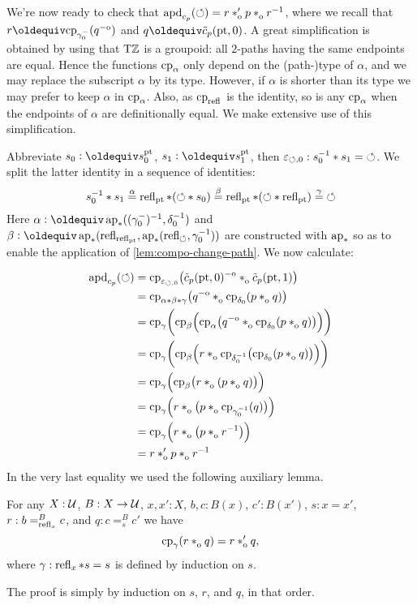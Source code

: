 \documentclass[a4paper,12pt]{amsart}
\begin{document}
We're now ready to check that $\apd{c_p}(\Zloop) = r \ctop p \cto r^{-1}$,
where we recall that $r\jdeq\cp{\gamma_0^-}(q\invo)$ and $q\jdeq\tilde c_p(\pt,0)$.
A great simplification is obtained by using that ${\mathrm{T}\mathbb{Z}}$ is a groupoid:
all $2$-paths having the same endpoints are equal.
Hence the functions $\mathrm{cp}_{\alpha}$ only depend on the (path-)type
of $\alpha$, and we may replace the subscript $\alpha$ by its type.
However, if $\alpha$ is shorter than its type we may
prefer to keep $\alpha$ in $\mathrm{cp}_{\alpha}$.
Also, as $\mathrm{cp}_{\mathop{{\mathrm{refl}}_{}}}$ is the identity, so is any $\mathrm{cp}_{\alpha}$
when the endpoints of $\alpha$ are definitionally equal.
We make extensive use of this simplification.

Abbreviate $s_0 \defeq s^\pt_0$, $s_1 \defeq s^\pt_1$,
then $\varepsilon_{{\circlearrowleft},0} : s_0^{-1} * s_1 = {{\circlearrowleft}}$.
We split the latter identity in a sequence of identities:
\[
s_0^{-1} * s_1 \stackrel{\alpha}{=}
\mathop{{\mathrm{refl}}_{{\mathord{\mathrm{pt}}}}}*({\circlearrowleft}* s_0) \stackrel{\beta}{=}
\mathop{{\mathrm{refl}}_{{\mathord{\mathrm{pt}}}}}*({\circlearrowleft}*\mathop{{\mathrm{refl}}_{{\mathord{\mathrm{pt}}}}})\stackrel{\gamma}{=} {{\circlearrowleft}}
\]
Here $\alpha\defeq\apc((\gamma_0^-)^{-1},\delta_0^{-1})$ and
$\beta\defeq\apc(\refl{\refl{\pt}},\apc(\refl{\Zloop},\gamma_0^{-1}))$ are constructed with $\mathop{\mathrm{ap}_{*}}$ so as to
enable the application of \cref{lem:compo-change-path}.
We now calculate:

\begin{align*}
  \apd{c_p}(\Zloop)
  &= \cp{\varepsilon_{\Zloop,0}}
    \bigl(\tilde c_p(\pt,0)\invo \cto \tilde c_p(\pt,1)\bigr) \\
  &= \cp{\alpha\ct\beta\ct\gamma}
    \bigl(q\invo \cto \cp{\delta_0}(p \cto q)\bigr) \\
  &= \cp{\gamma}\biggl(\cp{\beta}\Bigl(\cp{\alpha}
    \bigl(q\invo \cto \cp{\delta_0}(p \cto q)\bigr)\Bigr)\biggr) \\
  &= \cp{\gamma}\biggl(\cp{\beta}\Bigl(
    r \cto \cp{\delta_0^{-1}}\bigl(\cp{\delta_0}(p \cto q)\bigr)
    \Bigr)\biggr) \\
  &= \cp{\gamma}\Bigl(\cp{\beta}\bigl(
    r \cto (p \cto q)\bigr)\Bigr) \\
  &= \cp{\gamma}\Bigl(r \cto \bigl(p \cto \cp{\gamma_0^{-1}}(q)\bigl)\Bigr) \\
  &= \cp{\gamma}\Bigl(r \cto \bigl(p \cto r^{-1}\bigl)\Bigr) \\
  &= r \ctop p \cto r^{-1}
\end{align*}
In the very last equality we used the following auxiliary lemma.
\begin{lemma}
  For any $X : \mathcal{U}$, $B : X \to \mathcal{U}$, $x,x':X$, $b,c:B(x)$,
  $c':B(x')$, $s : x=x'$, $r : b =^B_{\mathop{{\mathrm{refl}}_{x}}} c$, and $q : c =^B_s c'$
  we have
  \[
    \cp{\gamma}(r \cto q) = r \ctop q,
  \]
  where $\gamma : \mathop{{\mathrm{refl}}_{x}} * s = s$ is defined by induction on $s$.
\end{lemma}
The proof is simply by induction on $s$, $r$, and $q$, in that order.
\end{document}
